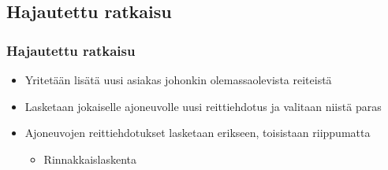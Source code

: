 \documentclass{beamer}
\begin{document}
\subsection{Hajautettu ratkaisu}
\begin{frame}
  \frametitle{Hajautettu ratkaisu}   %
\begin{itemize}
\item
Yritetään lisätä uusi asiakas johonkin olemassaolevista reiteistä %
\item
Lasketaan jokaiselle ajoneuvolle uusi reittiehdotus ja valitaan niistä paras
\item
Ajoneuvojen reittiehdotukset lasketaan erikseen, toisistaan riippumatta 
\begin{itemize}
 \item 
 Rinnakkaislaskenta
\end{itemize}
\end{itemize}
\end{frame}
\end{document}
